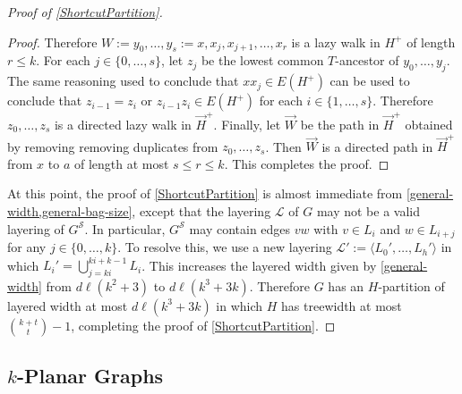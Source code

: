 \documentclass{patmorin}
\theoremstyle{plain}
\theoremstyle{definition}
\newcommand{\note}[2]{\noindent{\color{red}[#1:~#2]}}
\renewcommand{\SS}{\mathcal{S}}
\renewcommand{\le}{\leqslant}
\begin{document}
\begin{proof}[Proof of \cref{ShortcutPartition}]
\begin{proof}
  Therefore $W:=y_0,\ldots,y_s:=x,x_j,x_{j+1},\ldots,x_r$ is a lazy walk in $H^+$ of length $r\le k$.  For each $j\in \{0,\ldots,s\}$, let $z_j$ be the lowest common $T$-ancestor of $y_0,\ldots,y_j$.  The same reasoning used to conclude that $xx_j\in E(H^+)$ can be used to conclude that $z_{i-1}=z_i$ or $z_{i-1}z_i\in E(H^+)$ for each $i\in\{1,\ldots,s\}$.  Therefore $z_0,\ldots,z_s$ is a directed lazy walk in $\overrightarrow{H}^+$.  Finally, let $\overrightarrow{W}$ be the path in $\overrightarrow{H}^+$ obtained by removing removing duplicates from $z_0,\ldots,z_s$.  Then $\overrightarrow{W}$ is a directed path in $\overrightarrow{H}^+$ from $x$ to $a$ of length at most $s\le r\le k$.  This completes the proof.
\end{proof}

At this point, the proof of \cref{ShortcutPartition} is almost immediate from \cref{general-width,general-bag-size}, except that the layering $\mathcal{L}$ of $G$ may not be a valid layering of $G^{\SS}$.  In particular, $G^{\SS}$ may contain edges $vw$ with $v\in L_i$ and $w\in L_{i+j}$ for any $j\in\{0,\ldots,k\}$.  To resolve this, we use a new layering $\mathcal{L}':=\langle L_0',\ldots,L_h'\rangle$ in which $L_i'=\bigcup_{j=ki}^{ki+k-1} L_i$.  This increases the layered width given by \cref{general-width} from $d\ell(k^2+3)$ to $d\ell(k^3+3k)$.  Therefore $G$ has an $H$-partition of layered width at most $d\ell(k^3+3k)$ in which $H$ has treewidth at most $\binom{k+t}{t}-1$, completing the proof of \cref{ShortcutPartition}.
\end{proof}

\subsection{\boldmath $k$-Planar Graphs}
\label{k_planar_section}

\end{document}
